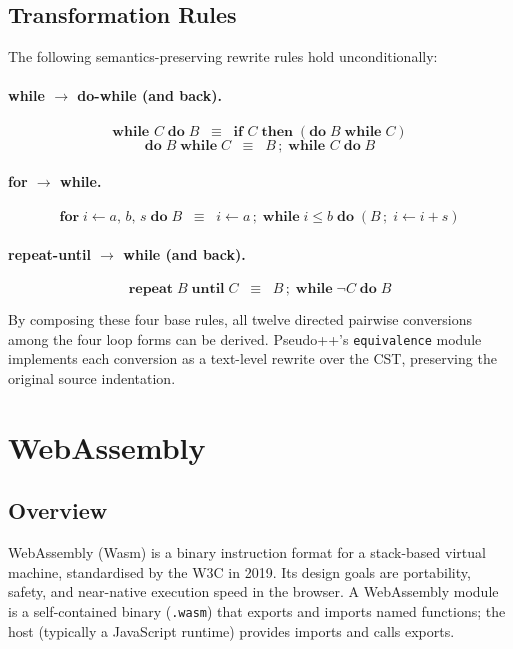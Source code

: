 \subsection{Transformation Rules}

The following semantics-preserving rewrite rules hold unconditionally:

\paragraph{while $\to$ do-while (and back).}
\[
  \textbf{while } C \;\textbf{do}\; B
  \;\;\equiv\;\;
  \textbf{if } C \;\textbf{then}\; (\textbf{do}\; B \;\textbf{while}\; C)
\]
\[
  \textbf{do}\; B \;\textbf{while}\; C
  \;\;\equiv\;\;
  B\,;\;\textbf{while } C \;\textbf{do}\; B
\]

\paragraph{for $\to$ while.}
\[
  \textbf{for}\; i \leftarrow a,\, b,\, s \;\textbf{do}\; B
  \;\;\equiv\;\;
  i \leftarrow a\,;\;\textbf{while}\; i \leq b \;\textbf{do}\; (B\,;\;i \leftarrow i + s)
\]

\paragraph{repeat-until $\to$ while (and back).}
\[
  \textbf{repeat}\; B \;\textbf{until}\; C
  \;\;\equiv\;\;
  B\,;\;\textbf{while}\; \neg C \;\textbf{do}\; B
\]

By composing these four base rules, all twelve directed pairwise conversions among
the four loop forms can be derived.  Pseudo++'s \texttt{equivalence} module
implements each conversion as a text-level rewrite over the CST, preserving the
original source indentation.

\section{WebAssembly}
\label{sec:webassembly}

\subsection{Overview}

WebAssembly (Wasm) \cite{haas2017wasm,wasm-spec} is a binary instruction
format for a stack-based virtual machine, standardised by the W3C in 2019.  Its design goals are
portability, safety, and near-native execution speed in the browser.  A WebAssembly
module is a self-contained binary (\texttt{.wasm}) that exports and imports named
functions; the host (typically a JavaScript runtime) provides imports and calls
exports.


